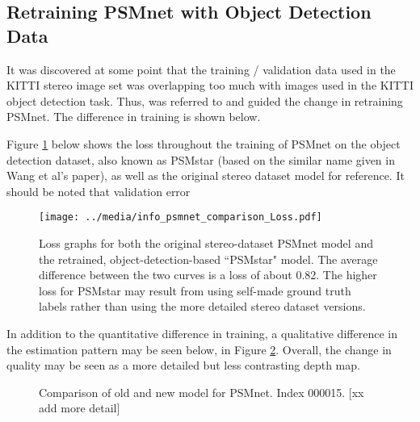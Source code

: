 \subsection{Retraining PSMnet with Object Detection Data}
It was discovered at some point that the training / validation data used in the KITTI stereo image set was overlapping too much with images used in the KITTI object detection task. Thus, \cite{wang_pseudo-lidar_2019} was referred to and guided the change in retraining PSMnet. The difference in training is shown below.

Figure \ref{psmnet_star_train_info} below shows the loss throughout the training of PSMnet on the object detection dataset, also known as PSMstar (based on the similar name given in Wang et al's paper), as well as the original stereo dataset model for reference. It should be noted that validation error 



\begin{figure}[H]
    \centering
        \texttt{[image: ../media/info\_psmnet\_comparison\_Loss.pdf]}
    \caption{Loss graphs for both the original stereo-dataset PSMnet model and the retrained, object-detection-based ``PSMstar" model. The average difference between the two curves is a loss of about 0.82. The higher loss for PSMstar may result from using self-made ground truth labels rather than using the more detailed stereo dataset versions.}
    \label{psmnet_star_train_info}
\end{figure}

In addition to the quantitative difference in training, a qualitative difference in the estimation pattern may be seen below, in Figure \ref{new_psmnet}. Overall, the change in quality may be seen as a more detailed but less contrasting depth map.

\begin{figure}[H]
    \centering
    \caption{Comparison of old and new model for PSMnet. Index 000015. [xx add more detail]}
    \label{new_psmnet}
\end{figure}



